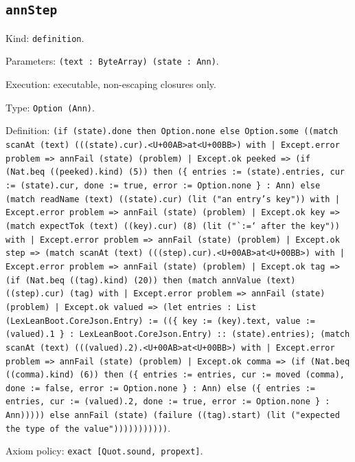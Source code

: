 \documentclass[11pt]{article}
\begin{document}
\subsection*{\texttt{annStep}}
\noindent Kind: \texttt{definition}.\par
\noindent Parameters: \texttt{(text : ByteArray) (state : Ann)}.\par
\noindent Execution: executable, non-escaping closures only.\par
\noindent Type: \texttt{Option (Ann)}.\par
\noindent Definition: \texttt{(if (state).done then Option.none else Option.some ((match scanAt (text) (((state).cur).<U+00AB>at<U+00BB>) with | Except.error problem => annFail (state) (problem) | Except.ok peeked => (if (Nat.beq ((peeked).kind) (5)) then (\{ entries := (state).entries, cur := (state).cur, done := true, error := Option.none \} : Ann) else (match readName (text) ((state).cur) (lit ("an entry's key")) with | Except.error problem => annFail (state) (problem) | Except.ok key => (match expectTok (text) ((key).cur) (8) (lit ("`:=` after the key")) with | Except.error problem => annFail (state) (problem) | Except.ok step => (match scanAt (text) (((step).cur).<U+00AB>at<U+00BB>) with | Except.error problem => annFail (state) (problem) | Except.ok tag => (if (Nat.beq ((tag).kind) (20)) then (match annValue (text) ((step).cur) (tag) with | Except.error problem => annFail (state) (problem) | Except.ok valued => (let entries : List (LexLeanBoot.CoreJson.Entry) := ((\{ key := (key).text, value := (valued).1 \} : LexLeanBoot.CoreJson.Entry) :: (state).entries); (match scanAt (text) (((valued).2).<U+00AB>at<U+00BB>) with | Except.error problem => annFail (state) (problem) | Except.ok comma => (if (Nat.beq ((comma).kind) (6)) then (\{ entries := entries, cur := moved (comma), done := false, error := Option.none \} : Ann) else (\{ entries := entries, cur := (valued).2, done := true, error := Option.none \} : Ann))))) else annFail (state) (failure ((tag).start) (lit ("expected the type of the value")))))))))))}.\par
\noindent Axiom policy: \texttt{exact [Quot.sound, propext]}.\par
\end{document}
